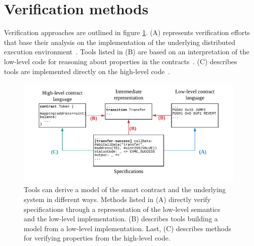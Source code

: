 \section{Verification methods}
\label{verification}

Verification approaches are outlined in figure \ref{fig:verification}. 
(A) represents verification efforts that base their analysis on the implementation of the underlying distributed execution environment~\cite{Hildenbrandt2017,Hirai2017,Bhargavan2016,Grishchenko2018}.
Tools listed in (B) are based on an interpretation of the low-level code for reasoning about properties in the contracts~\cite{Tsankov2017,Mueller2018,Luu2016,Albert2018,Grossman2017,Nikolic2018}. 
(C) describes tools are implemented directly on the high-level code~\cite{Alt2018}. 


\begin{figure}[!t]
\normalsize
\centering
\includegraphics[width=\columnwidth]{fig/Verification.pdf}
\caption{Tools can derive a model of the smart contract and the underlying system in different ways. 
Methods listed in (A) directly verify specifications through a representation of the low-level semantics and the low-level implementation. (B) describes tools building a model from a low-level implementation. Last, (C) describes methods for verifying properties from the high-level code.}
\label{fig:verification}
\end{figure}


